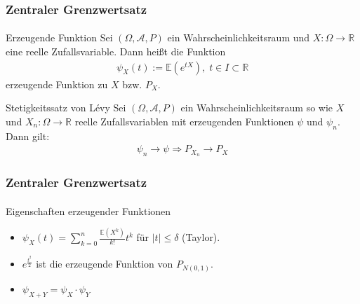 \documentclass{beamer}
\begin{document}
\begin{frame}
    \frametitle{Zentraler Grenzwertsatz}
\framesubtitle{}

\begin{block}{Erzeugende Funktion}
Sei $(\Omega, \mathcal{A}, P)$ ein Wahrscheinlichkeitsraum und $X :  \Omega \to \mathbb{R}$  eine reelle Zufallsvariable. Dann heißt die Funktion 
\begin{align*}
\psi_X(t) := \mathbb{E}(e^{tX}), \; t \in I \subset \mathbb{R}
\end{align*}
erzeugende Funktion zu $X$ bzw. $P_X$.
\end{block}

\begin{block}{Stetigkeitssatz von  Lévy }
Sei $(\Omega, \mathcal{A}, P)$ ein Wahrscheinlichkeitsraum so wie  $X$ und $X_n :  \Omega \to \mathbb{R}$   reelle Zufallsvariablen mit erzeugenden Funktionen $\psi$ und $\psi_{n}$. Dann gilt:
\begin{align*}
\psi_n \to \psi \Rightarrow P_{X_n} \to P_X 
\end{align*}
\end{block}

 \end{frame}

\begin{frame}
    \frametitle{Zentraler Grenzwertsatz}
\framesubtitle{}
\begin{block}{Eigenschaften erzeugender Funktionen}
\begin{itemize}
\item $\psi_X(t) = \sum_{k= 0}^n \frac{\mathbb{E}(X^k)}{k!} t^k$ für $|t| \leq \delta$ (Taylor).
\item $e^{\frac{t^2}{2}}$ ist die erzeugende Funktion von $ P_{N(0,1)}$.
\item $\psi_{X +Y} = \psi_X \cdot \psi_Y$
\end{itemize}

\end{block}


 \end{frame}
\end{document}
